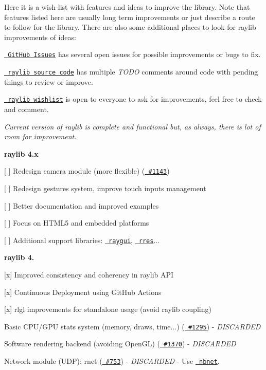 Here it is a wish-\/list with features and ideas to improve the library. Note that features listed here are usually long term improvements or just describe a route to follow for the library. There are also some additional places to look for raylib improvements of ideas\+:


\begin{DoxyItemize}
\item \href{https://github.com/raysan5/raylib/issues}{\texttt{ Git\+Hub Issues}} has several open issues for possible improvements or bugs to fix.
\item \href{https://github.com/raysan5/raylib/tree/master/src}{\texttt{ raylib source code}} has multiple {\itshape TODO} comments around code with pending things to review or improve.
\item \href{https://github.com/raysan5/raylib/discussions/1502}{\texttt{ raylib wishlist}} is open to everyone to ask for improvements, feel free to check and comment.
\end{DoxyItemize}

{\itshape Current version of raylib is complete and functional but, as always, there is lot of room for improvement.}

{\bfseries{raylib 4.\+x}}
\begin{DoxyItemize}
\item \mbox{[} \mbox{]} Redesign camera module (more flexible) (\href{https://github.com/raysan5/raylib/issues/1143}{\texttt{ \#1143}})
\item \mbox{[} \mbox{]} Redesign gestures system, improve touch inputs management
\item \mbox{[} \mbox{]} Better documentation and improved examples
\item \mbox{[} \mbox{]} Focus on HTML5 and embedded platforms
\item \mbox{[} \mbox{]} Additional support libraries\+: \href{https://github.com/raysan5/raygui}{\texttt{ raygui}}, \href{https://github.com/raysan5/rres}{\texttt{ rres}}...
\end{DoxyItemize}

{\bfseries{raylib 4.}}
\begin{DoxyItemize}
\item \mbox{[}x\mbox{]} Improved consistency and coherency in raylib API
\item \mbox{[}x\mbox{]} Continuous Deployment using Git\+Hub Actions
\item \mbox{[}x\mbox{]} rlgl improvements for standalone usage (avoid raylib coupling)
\item Basic CPU/\+GPU stats system (memory, draws, time...) (\href{https://github.com/raysan5/raylib/issues/1295}{\texttt{ \#1295}}) -\/ {\itshape DISCARDED}
\item Software rendering backend (avoiding Open\+GL) (\href{https://github.com/raysan5/raylib/issues/1370}{\texttt{ \#1370}}) -\/ {\itshape DISCARDED}
\item Network module (UDP)\+: {\ttfamily rnet} (\href{https://github.com/raysan5/raylib/issues/753}{\texttt{ \#753}}) -\/ {\itshape DISCARDED} -\/ Use \href{https://github.com/nathhB/nbnet}{\texttt{ nbnet}}.
\end{DoxyItemize}

